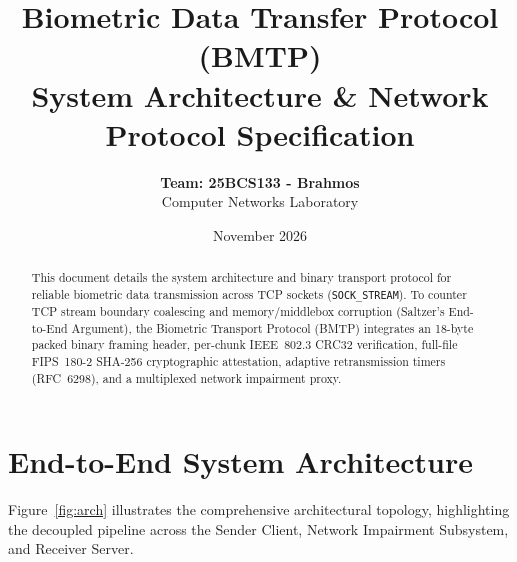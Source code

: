 \documentclass[11pt,a4paper]{article}
\title{\textbf{Biometric Data Transfer Protocol (BMTP)}\\\large System Architecture \& Network Protocol Specification}
\author{\textbf{Team: 25BCS133 - Brahmos} \\ Computer Networks Laboratory}
\date{November 2026}
\begin{document}
\maketitle

\begin{abstract}
This document details the system architecture and binary transport protocol for reliable biometric data transmission across TCP sockets (\texttt{SOCK\_STREAM}). To counter TCP stream boundary coalescing and memory/middlebox corruption (Saltzer's End-to-End Argument), the Biometric Transport Protocol (BMTP) integrates an 18-byte packed binary framing header, per-chunk IEEE~802.3 CRC32 verification, full-file FIPS~180-2 SHA-256 cryptographic attestation, adaptive retransmission timers (RFC~6298), and a multiplexed network impairment proxy.
\end{abstract}

\vspace{0.5em}

\section{End-to-End System Architecture}

Figure~\ref{fig:arch} illustrates the comprehensive architectural topology, highlighting the decoupled pipeline across the Sender Client, Network Impairment Subsystem, and Receiver Server.
\end{document}
